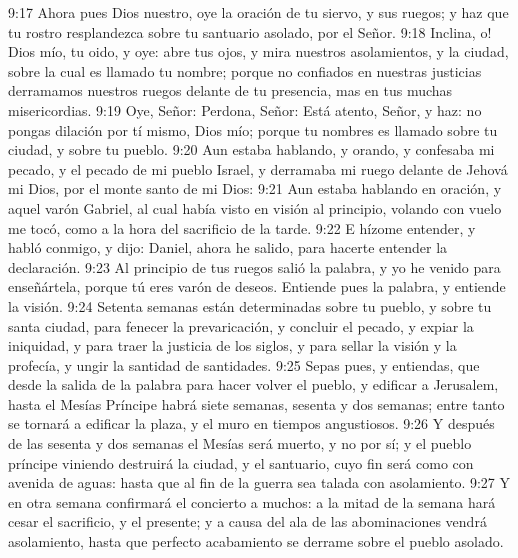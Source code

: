 9:17 Ahora pues Dios nuestro, oye la oración de tu siervo, y sus ruegos; y haz que tu rostro resplandezca sobre tu santuario asolado, por el Señor.
9:18 Inclina, o! Dios mío, tu oido, y oye: abre tus ojos, y mira nuestros asolamientos, y la ciudad, sobre la cual es llamado tu nombre; porque no confiados en nuestras justicias derramamos nuestros ruegos delante de tu presencia, mas en tus muchas misericordias.
9:19 Oye, Señor: Perdona, Señor: Está atento, Señor, y haz: no pongas dilación por tí mismo, Dios mío; porque tu nombres es llamado sobre tu ciudad, y sobre tu pueblo.
9:20 Aun estaba hablando, y orando, y confesaba mi pecado, y el pecado de mi pueblo Israel, y derramaba mi ruego delante de Jehová mi Dios, por el monte santo de mi Dios:
9:21 Aun estaba hablando en oración, y aquel varón Gabriel, al cual había visto en visión al principio, volando con vuelo me tocó, como a la hora del sacrificio de la tarde.
9:22 E hízome entender, y habló conmigo, y dijo: Daniel, ahora he salido, para hacerte entender la declaración.
9:23 Al principio de tus ruegos salió la palabra, y yo he venido para enseñártela, porque tú eres varón de deseos. Entiende pues la palabra, y entiende la visión.
9:24 Setenta semanas están determinadas sobre tu pueblo, y sobre tu santa ciudad, para fenecer la prevaricación, y concluir el pecado, y expiar la iniquidad, y para traer la justicia de los siglos, y para sellar la visión y la profecía, y ungir la santidad de santidades.
9:25 Sepas pues, y entiendas, que desde la salida de la palabra para hacer volver el pueblo, y edificar a Jerusalem, hasta el Mesías Príncipe habrá siete semanas, sesenta y dos semanas; entre tanto se tornará a edificar la plaza, y el muro en tiempos angustiosos.
9:26 Y después de las sesenta y dos semanas el Mesías será muerto, y no por sí; y el pueblo príncipe viniendo destruirá la ciudad, y el santuario, cuyo fin será como con avenida de aguas: hasta que al fin de la guerra sea talada con asolamiento.
9:27 Y en otra semana confirmará el concierto a muchos: a la mitad de la semana hará cesar el sacrificio, y el presente; y a causa del ala de las abominaciones vendrá asolamiento, hasta que perfecto acabamiento se derrame sobre el pueblo asolado.

